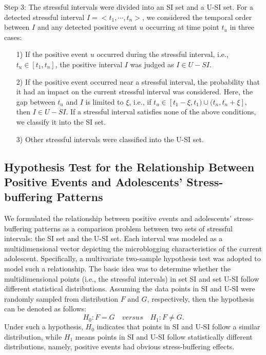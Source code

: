 \documentclass[5p,times,numbers,authoryear]{elsarticle}
\begin{document}
Step 3: The stressful intervals were divided into an SI set and a U-SI set.
For a detected stressful interval $I = <t_1,\cdots,t_n>$, we considered the temporal order between $I$ and any detected positive event $u$ occurring at time point $t_u$ in three cases:
\begin{itemize}
\item[1)] If the positive event $u$ occurred during the stressful interval, i.e., $t_u \in [t_1,t_n]$, the positive interval $I$ was judged as $I \in U-SI$.
\vspace{-0.3cm}
\item[2)] If the positive event occurred near a stressful interval, the probability that it had an impact on the current stressful interval was considered.
Here, the gap between $t_u$ and $I$ is limited to $\xi$, i.e.,
if $t_u \in [t_{1}-\xi, t_1)\cup(t_{n},t_{n}+\xi]$, then $I \in U-SI$.
If a stressful interval satisfies none of the above conditions, we classify it into the SI set.
\vspace{-0.3cm}
\item[3)] Other stressful intervals were classified into the U-SI set.
\end{itemize}

\subsection{Hypothesis Test for the Relationship Between Positive Events and Adolescents' Stress-buffering Patterns}
\label{sec:frame2}
We formulated the relationship between positive events and adolescents' stress-buffering patterns as a comparison problem between two sets of stressful intervals: the SI set and the U-SI set.
Each interval was modeled as a multidimensional vector depicting the microblogging characteristics of the current adolescent.
Specifically, a multivariate two-sample hypothesis test
\cite{Li2017Correlating,Johnson2012Applied} was adopted to model such a relationship.
The basic idea was to determine whether the multidimensional points (i.e., the stressful intervals)
in set SI and set U-SI follow different statistical distributions.
Assuming the data points in SI and U-SI were randomly sampled from distribution $F$ and $G$, respectively, then the hypothesis can be denoted as follows:
\begin{equation}
H_0: F = G \quad versus \quad H_1: F \neq G.
\end{equation}
Under such a hypothesis,
$H_0$ indicates that points in SI and U-SI follow a similar distribution,
while $H_1$ means points in SI and U-SI follow statistically different distributions,
namely, positive events had obvious stress-buffering effects.
\end{document}
